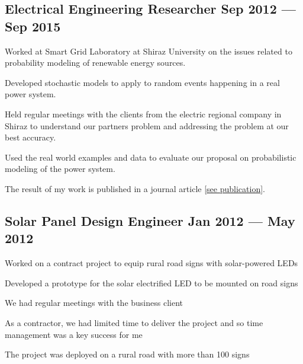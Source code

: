 \documentclass[letter,10pt]{article}
\begin{document}
\subsection{Electrical Engineering Researcher \hfill Sep 2012 --- Sep 2015}
\begin{zitemize}
	\item Worked at Smart Grid Laboratory at Shiraz University on the issues related to probability modeling of renewable energy sources.
	\item Developed stochastic models to apply to random events happening in a real power system.
	\item Held regular meetings with the clients from the electric regional company in Shiraz to understand our partners problem and addressing the problem at our best accuracy.
	\item Used the real world examples and data to evaluate our proposal on probabilistic modeling of the power system.
	\item The result of my work is published in a journal article [\href{https://ieeexplore.ieee.org/abstract/document/7434076}{see publication}].
\end{zitemize}


\subsection{Solar Panel Design Engineer \hfill Jan 2012 --- May 2012}
\begin{zitemize}
	\item Worked on a contract project to equip rural road signs with solar-powered LEDs
	\item Developed a prototype for the solar electrified LED to be mounted on road signs
	\item We had regular meetings with the business client
	\item As a contractor, we had limited time to deliver the project and so time management was a key success for me
	\item The project was deployed on a rural road with more than 100 signs
\end{zitemize}
\end{document}
